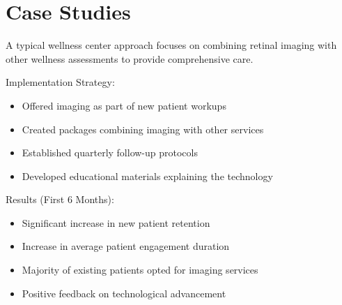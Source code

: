 \documentclass[
  Letterpaper,
]{scrbook}
\providecommand{\tightlist}{%
  \setlength{\itemsep}{0pt}\setlength{\parskip}{0pt}}\usepackage{longtable,booktabs,array}
\begin{document}
\section{Case Studies}\label{case-studies}

\begin{tcolorbox}[enhanced jigsaw, opacityback=0, titlerule=0mm, toptitle=1mm, breakable, arc=.35mm, colframe=quarto-callout-note-color-frame, coltitle=black, colbacktitle=quarto-callout-note-color!10!white, bottomtitle=1mm, rightrule=.15mm, leftrule=.75mm, title=\textcolor{quarto-callout-note-color}{\faInfo}\hspace{0.5em}{Case Study 1: Integrative Wellness Center}, bottomrule=.15mm, colback=white, toprule=.15mm, opacitybacktitle=0.6, left=2mm]

A typical wellness center approach focuses on combining retinal imaging
with other wellness assessments to provide comprehensive care.

Implementation Strategy:

\begin{itemize}
\tightlist
\item
  Offered imaging as part of new patient workups
\item
  Created packages combining imaging with other services
\item
  Established quarterly follow-up protocols
\item
  Developed educational materials explaining the technology
\end{itemize}

Results (First 6 Months):

\begin{itemize}
\tightlist
\item
  Significant increase in new patient retention
\item
  Increase in average patient engagement duration
\item
  Majority of existing patients opted for imaging services
\item
  Positive feedback on technological advancement
\end{itemize}

\end{tcolorbox}
\end{document}
